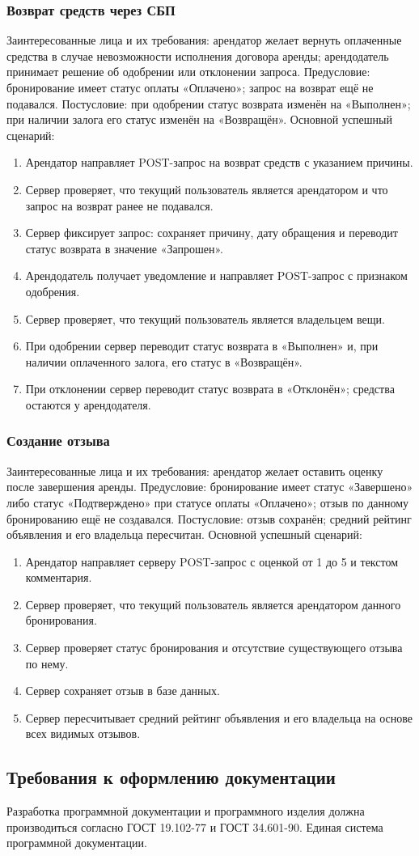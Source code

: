 \subsubsection{Возврат средств через СБП}
Заинтересованные лица и их требования: арендатор желает вернуть оплаченные средства в случае невозможности исполнения договора аренды; арендодатель принимает решение об одобрении или отклонении запроса.
Предусловие: бронирование имеет статус оплаты «Оплачено»; запрос на возврат ещё не подавался.
Постусловие: при одобрении статус возврата изменён на «Выполнен»; при наличии залога его статус изменён на «Возвращён».
Основной успешный сценарий:
\begin{enumerate}
\item Арендатор направляет POST-запрос на возврат средств с указанием причины.
\item Сервер проверяет, что текущий пользователь является арендатором и что запрос на возврат ранее не подавался.
\item Сервер фиксирует запрос: сохраняет причину, дату обращения и переводит статус возврата в значение «Запрошен».
\item Арендодатель получает уведомление и направляет POST-запрос с признаком одобрения.
\item Сервер проверяет, что текущий пользователь является владельцем вещи.
\item При одобрении сервер переводит статус возврата в «Выполнен» и, при наличии оплаченного залога, его статус в «Возвращён».
\item При отклонении сервер переводит статус возврата в «Отклонён»; средства остаются у арендодателя.
\end{enumerate}

\subsubsection{Создание отзыва}
Заинтересованные лица и их требования: арендатор желает оставить оценку после завершения аренды.
Предусловие: бронирование имеет статус «Завершено» либо статус «Подтверждено» при статусе оплаты «Оплачено»; отзыв по данному бронированию ещё не создавался.
Постусловие: отзыв сохранён; средний рейтинг объявления и его владельца пересчитан.
Основной успешный сценарий:
\begin{enumerate}
\item Арендатор направляет серверу POST-запрос с оценкой от 1 до 5 и текстом комментария.
\item Сервер проверяет, что текущий пользователь является арендатором данного бронирования.
\item Сервер проверяет статус бронирования и отсутствие существующего отзыва по нему.
\item Сервер сохраняет отзыв в базе данных.
\item Сервер пересчитывает средний рейтинг объявления и его владельца на основе всех видимых отзывов.
\end{enumerate}

\subsection{Требования к оформлению документации}
Разработка программной документации и программного изделия должна производиться согласно ГОСТ 19.102-77 и ГОСТ 34.601-90. Единая система программной документации.
